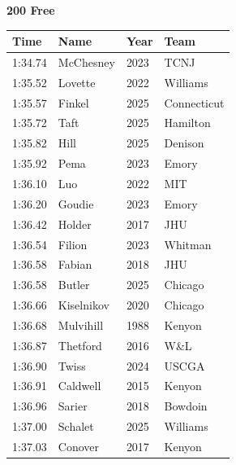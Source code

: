 \noindent\begin{minipage}[t]{0.98\textwidth}
\centering
\textbf{\textcolor{teamprimary}{200 Free}}\par
\vspace{0.5em}
\centering
\small
\renewcommand{\arraystretch}{1.0}
\setlength{\tabcolsep}{4pt}
\begin{tabular}{@{}p{2.5cm}p{4.5cm}p{1.5cm}p{2.5cm}@{}}
\toprule
\textbf{Time} & \textbf{Name} & \textbf{Year} & \textbf{Team} \\
\midrule
1:34.74 & McChesney & 2023 & TCNJ \\
1:35.52 & Lovette & 2022 & Williams \\
1:35.57 & Finkel & 2025 & Connecticut \\
1:35.72 & Taft & 2025 & Hamilton \\
1:35.82 & Hill & 2025 & Denison \\
1:35.92 & Pema & 2023 & Emory \\
1:36.10 & Luo & 2022 & MIT \\
1:36.20 & Goudie & 2023 & Emory \\
1:36.42 & Holder & 2017 & JHU \\
1:36.54 & Filion & 2023 & Whitman \\
1:36.58 & Fabian & 2018 & JHU \\
1:36.58 & Butler & 2025 & Chicago \\
1:36.66 & Kiselnikov & 2020 & Chicago \\
1:36.68 & Mulvihill & 1988 & Kenyon \\
1:36.87 & Thetford & 2016 & W\&L \\
1:36.90 & Twiss & 2024 & USCGA \\
1:36.91 & Caldwell & 2015 & Kenyon \\
1:36.96 & Sarier & 2018 & Bowdoin \\
1:37.00 & Schalet & 2025 & Williams \\
1:37.03 & Conover & 2017 & Kenyon \\
\bottomrule
\end{tabular}
\end{minipage}
\vspace{1.2em}
